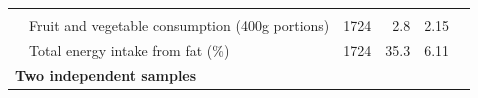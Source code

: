 \documentclass[11pt,a4paper,openany]{book}
\begin{document}
\begin{longtable}[]{@{}lrrrr@{}}
\begin{minipage}[t]{0.06\columnwidth}
\strut
\end{minipage} & \begin{minipage}[t]{0.10\columnwidth}\raggedleft\strut
\strut
\end{minipage} & \begin{minipage}[t]{0.07\columnwidth}\raggedleft\strut
\strut
\end{minipage} & \begin{minipage}[t]{0.08\columnwidth}\raggedleft\strut
\strut
\end{minipage}\tabularnewline
\begin{minipage}[t]{0.55\columnwidth}\raggedright\strut
~~Fruit and vegetable consumption (400g portions)\strut
\end{minipage} & \begin{minipage}[t]{0.06\columnwidth}\raggedleft\strut
1724\strut
\end{minipage} & \begin{minipage}[t]{0.10\columnwidth}\raggedleft\strut
2.8\strut
\end{minipage} & \begin{minipage}[t]{0.07\columnwidth}\raggedleft\strut
2.15\strut
\end{minipage} & \begin{minipage}[t]{0.08\columnwidth}\raggedleft\strut
\strut
\end{minipage}\tabularnewline
\begin{minipage}[t]{0.55\columnwidth}\raggedright\strut
~~Total energy intake from fat (\%) \newline\strut
\end{minipage} & \begin{minipage}[t]{0.06\columnwidth}\raggedleft\strut
1724\strut
\end{minipage} & \begin{minipage}[t]{0.10\columnwidth}\raggedleft\strut
35.3\strut
\end{minipage} & \begin{minipage}[t]{0.07\columnwidth}\raggedleft\strut
6.11\strut
\end{minipage} & \begin{minipage}[t]{0.08\columnwidth}\raggedleft\strut
\strut
\end{minipage}\tabularnewline
\begin{minipage}[t]{0.55\columnwidth}\raggedright\strut
\textbf{Two independent samples}\strut
\end{minipage} & \begin{minipage}[t]{0.06\columnwidth}\raggedleft\strut

\end{minipage}
\end{longtable}
\end{document}
